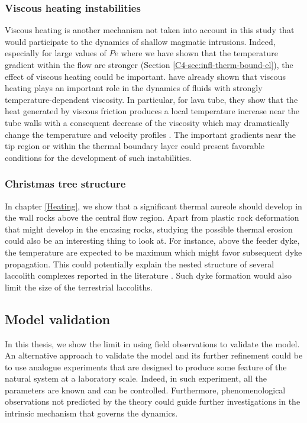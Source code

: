 \subsubsection*{Viscous heating instabilities}

Viscous heating  is another mechanism  not taken into account  in this
study  that would  participate  to the  dynamics  of shallow  magmatic
intrusions. Indeed, especially for large  values of $Pe$ where we have
shown  that the  temperature  gradient within  the  flow are  stronger
(Section  \ref{C4-sec:infl-therm-bound-el}),  the  effect  of  viscous
heating could  be important.  \citet{Costa:2005bq} have  already shown
that viscous heating plays an important role in the dynamics of fluids
with strongly temperature-dependent viscosity. In particular, for lava
tube, they show that the heat generated by viscous friction produces a
local  temperature increase  near  the tube  walls  with a  consequent
decrease  of   the  viscosity   which  may  dramatically   change  the
temperature             and              velocity             profiles
\citep{Costa:2002cj,Costa:2003wk,Costa:2005bq}.      The     important
gradients near  the tip  region or within  the thermal  boundary layer
could  present  favorable  conditions  for  the  development  of  such
instabilities.

\subsubsection*{Christmas tree structure}

In chapter \ref{Heating},  we show that a  significant thermal aureole
should develop in the wall rocks above the central flow region.  Apart
from  plastic rock  deformation  that might  develop  in the  encasing
rocks,  studying  the  possible  thermal  erosion  could  also  be  an
interesting thing to look at. For instance, above the feeder dyke, the
temperature are  expected to be  maximum which might  favor subsequent
dyke propagation.  This could potentially explain the nested structure
of   several   laccolith   complexes  reported   in   the   literature
\citep{E:2015tl,Rocchi:2010dn}.  Such dyke  formation would also limit
the size of the terrestrial laccoliths.

\subsection{Model validation}

In  this thesis,  we show  the limit  in using  field observations  to
validate the model. An alternative  approach to validate the model and
its further refinement  could be to use analogue  experiments that are
designed to produce some feature of the natural system at a laboratory
scale.  Indeed, in  such experiment, all the parameters  are known and
can  be controlled.   Furthermore,  phenomenological observations  not
predicted  by the  theory could  guide further  investigations in  the
intrinsic mechanism that governs the dynamics.

